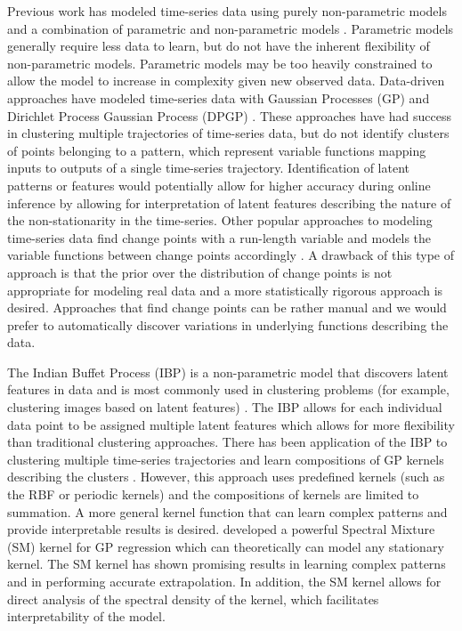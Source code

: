 \documentclass{article}
\begin{document}
Previous work has modeled time-series data using purely non-parametric models \cite{FastNonP} and a combination of parametric and non-parametric models \cite{StructDiscNonPara}. Parametric models generally require less data to learn, but do not have the inherent flexibility of non-parametric models. Parametric models may be too heavily constrained to allow the model to increase in complexity given new observed data. Data-driven approaches have modeled time-series data with Gaussian Processes (GP) and Dirichlet Process Gaussian Process (DPGP) \cite{DPGPwithConstraints}. These approaches have had success in clustering multiple trajectories of time-series data, but do not identify clusters of points belonging to a pattern, which represent variable functions mapping inputs to outputs of a single time-series trajectory. Identification of latent patterns or features would potentially allow for higher accuracy during online inference by allowing for interpretation of latent features describing the nature of the non-stationarity in the time-series. Other popular approaches to modeling time-series data find change points with a run-length variable and models the variable functions between change points accordingly \cite{GPChangePointModels}. A drawback of this type of approach is that the prior over the distribution of change points is not appropriate for modeling real data and a more statistically rigorous approach is desired. Approaches that find change points can be rather manual and we would prefer to automatically discover variations in underlying functions describing the data.

The Indian Buffet Process (IBP) is a non-parametric model that discovers latent features in data and is most commonly used in clustering problems (for example, clustering images based on latent features) \cite{IBPshort}. The IBP allows for each individual data point to be assigned multiple latent features which allows for more flexibility than traditional clustering approaches. There has been application of the IBP to clustering multiple time-series trajectories and learn compositions of GP kernels describing the clusters \cite{IBPGP}. However, this approach uses predefined kernels (such as the RBF or periodic kernels) and the compositions of kernels are limited to summation. A more general kernel function that can learn complex patterns and provide interpretable results is desired. \cite{SMK} developed a powerful Spectral Mixture (SM) kernel for GP regression which can theoretically can model any stationary kernel. The SM kernel has shown promising results in learning complex patterns and in performing accurate extrapolation. In addition, the SM kernel allows for direct analysis of the spectral density of the kernel, which facilitates interpretability of the model.
\end{document}
